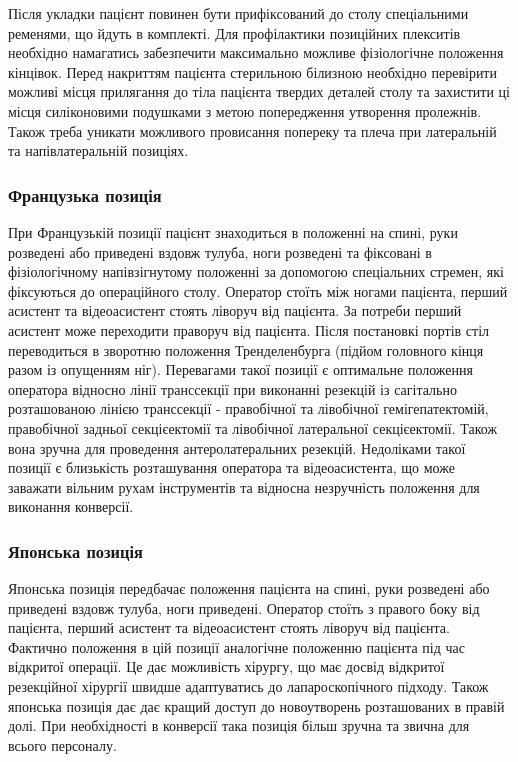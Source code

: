 \begin{refsection}
Після укладки пацієнт повинен бути прифіксований до столу спеціальними ременями, що йдуть в комплекті. Для профілактики позиційних плекситів необхідно намагатись забезпечити максимально можливе фізіологічне положення кінцівок. Перед накриттям пацієнта стерильною білизною необхідно перевірити можливі місця прилягання до тіла пацієнта твердих деталей столу та захистити ці місця силіконовими подушками з метою попередження утворення пролежнів. Також треба уникати можливого провисання попереку та плеча при латеральній та напівлатеральній позиціях.


\subsubsection{Французька позиція}

При Французькій позиції пацієнт знаходиться в положенні на спині, руки розведені або приведені вздовж тулуба, ноги розведені та фіксовані в фізіологічному напівзігнутому положенні за допомогою спеціальних стремен, які фіксуються до операційного столу. Оператор стоїть між ногами пацієнта, перший асистент та відеоасистент стоять ліворуч від пацієнта. За потреби перший асистент може переходити праворуч від пацієнта. Після постановкі портів стіл переводиться в зворотню положення Тренделенбурга (підйом головного кінця разом із опущенням ніг). Перевагами такої позиції є оптимальне положення оператора відносно лінії транссекції при виконанні резекцій із сагітально розташованою лінією транссекції -  правобічної та лівобічної гемігепатектомій, правобічної задньої секцієектомії та лівобічної латеральної секцієектомії. Також вона зручна для проведення антеролатеральних резекцій. Недоліками такої позиції є близькість розташування оператора та відеоасистента, що може заважати вільним рухам інструментів та відносна незручність положення для виконання конверсії.

\subsubsection{Японська позиція}

Японська позиція передбачає положення пацієнта на спині, руки розведені або приведені вздовж тулуба, ноги приведені. Оператор стоїть з правого боку від пацієнта, перший асистент та відеоасистент стоять ліворуч від пацієнта. Фактично положення в цій позиції аналогічне положенню пацієнта під час відкритої операції. Це дає можливість хірургу, що має досвід відкритої резекційної хірургії швидше адаптуватись до лапароскопічного підходу. Також японська позиція дає дає кращий доступ до новоутворень розташованих в правій долі. При необхідності в конверсії така позиція більш зручна та звична для всього персоналу.


\end{refsection}
